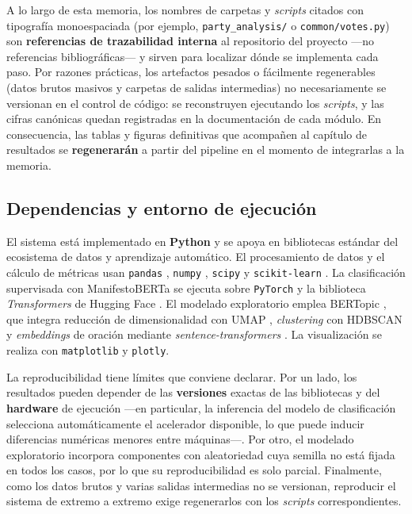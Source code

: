 A lo largo de esta memoria, los nombres de carpetas y \emph{scripts} citados con
tipografía monoespaciada (por ejemplo, \texttt{party\_analysis/} o
\texttt{common/votes.py}) son \textbf{referencias de trazabilidad interna} al
repositorio del proyecto ---no referencias bibliográficas--- y sirven para
localizar dónde se implementa cada paso. Por razones prácticas, los artefactos
pesados o fácilmente regenerables (datos brutos masivos y carpetas de salidas
intermedias) no necesariamente se versionan en el control de código: se
reconstruyen ejecutando los \emph{scripts}, y las cifras canónicas quedan
registradas en la documentación de cada módulo. En consecuencia, las tablas y
figuras definitivas que acompañen al capítulo de resultados se
\textbf{regenerarán} a partir del pipeline en el momento de integrarlas a la
memoria.

\subsection{Dependencias y entorno de ejecución}
\label{sec:arq-entorno}

El sistema está implementado en \textbf{Python} y se apoya en bibliotecas
estándar del ecosistema de datos y aprendizaje automático. El procesamiento de
datos y el cálculo de métricas usan \texttt{pandas} \cite{mckinney2010pandas},
\texttt{numpy} \cite{harris2020numpy}, \texttt{scipy} \cite{virtanen2020scipy} y
\texttt{scikit-learn} \cite{pedregosa2011scikit}. La clasificación supervisada
con ManifestoBERTa se ejecuta sobre \texttt{PyTorch}
\cite{paszke2019pytorch} y la biblioteca \emph{Transformers} de Hugging Face
\cite{wolf2020transformers}. El modelado exploratorio emplea BERTopic
\cite{grootendorst2022bertopic}, que integra reducción de dimensionalidad con
UMAP \cite{mcinnes2018umap}, \emph{clustering} con HDBSCAN
\cite{mcinnes2017hdbscan} y \emph{embeddings} de oración mediante
\emph{sentence-transformers} \cite{reimers2019sentencebert}. La visualización se
realiza con \texttt{matplotlib} y \texttt{plotly}.

La reproducibilidad tiene límites que conviene declarar. Por un lado, los
resultados pueden depender de las \textbf{versiones} exactas de las bibliotecas y
del \textbf{hardware} de ejecución ---en particular, la inferencia del modelo de
clasificación selecciona automáticamente el acelerador disponible, lo que puede
inducir diferencias numéricas menores entre máquinas---. Por otro, el modelado
exploratorio incorpora componentes con aleatoriedad cuya semilla no está fijada
en todos los casos, por lo que su reproducibilidad es solo parcial. Finalmente,
como los datos brutos y varias salidas intermedias no se versionan, reproducir el
sistema de extremo a extremo exige regenerarlos con los \emph{scripts}
correspondientes.

